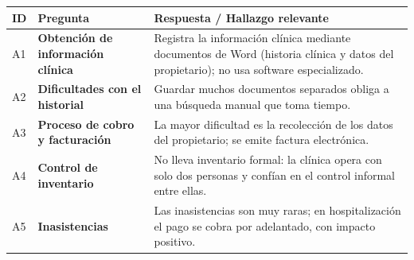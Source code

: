 \documentclass[
]{article}
\newcounter{none} %
\begin{document}
{\def\LTcaptype{none} %
\begin{longtable}[]{|
  >{\centering\arraybackslash}p{}|
  >{\raggedright\arraybackslash}p{}|
  >{\raggedright\arraybackslash}p{}|}
\hline
\begin{minipage}[b]{\linewidth}\centering
\textbf{ID}
\end{minipage} & \begin{minipage}[b]{\linewidth}\centering
\textbf{Pregunta}
\end{minipage} & \begin{minipage}[b]{\linewidth}\raggedright
\textbf{Respuesta / Hallazgo relevante}
\end{minipage} \\
\hline
\endhead
\hline
\endlastfoot
A1 & \textbf{Obtención de información clínica} &
\begin{minipage}[t]{\linewidth}\raggedright
Registra la información clínica mediante documentos de Word (historia clínica y datos del propietario); no usa software especializado.
\end{minipage} \\
\hline
A2 & \textbf{Dificultades con el historial} &
\begin{minipage}[t]{\linewidth}\raggedright
Guardar muchos documentos separados obliga a una búsqueda manual que toma tiempo.
\end{minipage} \\
\hline
A3 & \textbf{Proceso de cobro y facturación} &
\begin{minipage}[t]{\linewidth}\raggedright
La mayor dificultad es la recolección de los datos del propietario; se emite factura electrónica.
\end{minipage} \\
\hline
A4 & \textbf{Control de inventario} &
\begin{minipage}[t]{\linewidth}\raggedright
No lleva inventario formal: la clínica opera con solo dos personas y confían en el control informal entre ellas.
\end{minipage} \\
\hline
A5 & \textbf{Inasistencias} &
\begin{minipage}[t]{\linewidth}\raggedright
Las inasistencias son muy raras; en hospitalización el pago se cobra por adelantado, con impacto positivo.
\end{minipage} \\

\end{longtable}}
\end{document}

